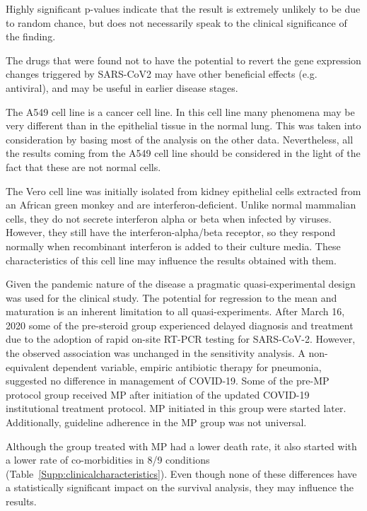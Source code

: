\documentclass[Minh_PhD_thesis.tex]{subfiles}
\begin{document}
Highly significant p-values indicate that the result is extremely unlikely to be due to random chance, but does not necessarily speak to the clinical significance of the finding. 

The drugs that were found not to have the potential to revert the gene expression changes triggered by SARS-CoV2 may have other beneficial effects (e.g. antiviral), and may be useful in earlier disease stages. 




The  A549 cell line  is a cancer cell line. In this cell line many phenomena may be very different than in the epithelial tissue in the normal lung. This was taken into consideration by basing most of the analysis on the other data. Nevertheless, all the results coming from the A549 cell line should be considered in the light of the fact that these are not normal cells. 

The Vero cell line was initially isolated from kidney epithelial cells extracted from an African green monkey and are interferon-deficient. Unlike normal mammalian cells, they do not secrete interferon alpha or beta when infected by viruses. However, they still have the interferon-alpha/beta receptor, so they respond normally when recombinant interferon is added to their culture media. These characteristics of this cell line may influence the results obtained with them. 

Given the pandemic nature of the disease a pragmatic quasi-experimental design was used for the clinical study. The potential for regression to the mean and maturation is an inherent limitation to all quasi-experiments. 
After March 16, 2020 some of the pre-steroid group experienced delayed diagnosis and treatment due to the adoption of rapid on-site RT-PCR testing for SARS-CoV-2. However, the observed association was unchanged in the sensitivity analysis.  A non-equivalent dependent variable, empiric antibiotic therapy for pneumonia, suggested no difference in management of COVID-19. 
Some of the pre-MP protocol group received MP after initiation of the updated COVID-19 institutional treatment protocol.  MP initiated in this group were started  later. Additionally, guideline adherence in the MP  group was not universal. 

Although the group treated with MP had a lower death rate, it also started with a lower rate of co-morbidities in 8/9 conditions (Table~\ref{Supp:clinicalcharacteristics}). Even though none of these differences have a statistically significant impact on the survival analysis, they may influence the results. 
\end{document}
